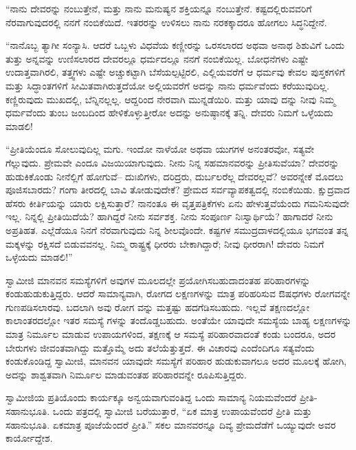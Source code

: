 “ನಾನು ದೇವರನ್ನು ನಂಬುತ್ತೇನೆ, ಮತ್ತು ನಾನು ಮನುಷ್ಯನ ಶಕ್ತಿಯನ್ನೂ ನಂಬುತ್ತೇನೆ. ಕಷ್ಟದಲ್ಲಿರುವವರಿಗೆ ನೆರವಾಗುವುದರಲ್ಲಿ ನನಗೆ ನಂಬಿಕೆಯಿದೆ. ಇತರರನ್ನು ಉಳಿಸಲು ನಾನು ನರಕಕ್ಕಾದರೂ ಹೋಗಲು ಸಿದ್ಧನಿದ್ದೇನೆ.

“ನಾನೊಬ್ಬ ತ್ಯಾಗೀ ಸಂನ್ಯಾಸಿ. ಆದರೆ ಒಬ್ಬಳು ವಿಧವೆಯ ಕಣ್ಣೀರನ್ನು ಒರಸಲಾರದ ಅಥವಾ ಅನಾಥ ಶಿಶುವಿಗೆ ಒಂದು ತುತ್ತು ಅನ್ನವನ್ನು ಉಣಿಸಲಾರದ ದೇವರಲ್ಲೂ ಧರ್ಮದಲ್ಲೂ ನನಗೆ ನಂಬಿಕೆಯಿಲ್ಲ. ಬೋಧನೆಗಳು ಎಷ್ಟೇ ಉದಾತ್ತವಾಗಿರಲಿ, ತತ್ತ್ವಗಳು ಎಷ್ಟೇ ಅಚ್ಚುಕಟ್ಟಾಗಿ ಬೆಸೆಯಲ್ಪಟ್ಟಿರಲಿ, ಎಲ್ಲಿಯವರೆಗೆ ಆ ಧರ್ಮವು ಕೇವಲ ಪುಸ್ತಕಗಳಿಗೆ ಮತ್ತು ಸಿದ್ಧಾಂತಗಳಿಗೆ ಸೀಮಿತವಾಗಿರುತ್ತದೆಯೋ ಅಲ್ಲಿಯವರೆಗೆ ಅದನ್ನು ನಾನು ಧರ್ಮವೆಂದು ಕರೆಯುವುದಿಲ್ಲ. ಕಣ್ಣಿರುವುದು ಮುಖದಲ್ಲಿ, ಬೆನ್ನಿನಲ್ಲಲ್ಲ. ಆದ್ದರಿಂದ ನೇರವಾಗಿ ಮುನ್ನಡೆಯಿರಿ. ಮತ್ತು ಯಾವು ದನ್ನು ನೀವು ನಿಮ್ಮ ಧರ್ಮವೆಂದು ತುಂಬ ಜಂಬದಿಂದ ಹೇಳಿಕೊಳ್ಳುತ್ತೀರೋ ಅದನ್ನು ಅನುಷ್ಠಾನಕ್ಕೆ ತನ್ನಿ. ದೇವರು ನಿಮಗೆ ಒಳ್ಳೆಯದು ಮಾಡಲಿ!

“ಪ್ರೀತಿಯೆಂದೂ ಸೋಲುವುದಿಲ್ಲ ಮಗು. ಇಂದೋ ನಾಳೆಯೋ ಅಥವಾ ಯುಗಗಳ ಅನಂತರವೋ, ಸತ್ಯವೇ ಗೆಲ್ಲುವುದು. ಪ್ರೇಮವೇ ಎಂದೂ ವಿಜಯಿಯಾಗುವುದು. ನೀನು ನಿನ್ನ ಸಹಮಾನವರನ್ನು ಪ್ರೀತಿಸುವೆಯಾ? ದೇವರನ್ನು ಹುಡುಕಿಕೊಂಡು ನೀನೆಲ್ಲಿಗೆ ಹೋಗುವೆ– ದುಃಖಿಗಳು, ದರಿದ್ರರು, ದುರ್ಬಲರೆಲ್ಲ ದೇವರಲ್ಲವೆ? ಅವರನ್ನೇಕೆ ಮೊದಲು ಪೂಜಿಸಬಾರದು? ಗಂಗಾ ತೀರದಲ್ಲಿ ಬಾವಿ ತೋಡುವುದೇಕೆ? ಪ್ರೇಮದ ಸರ್ವವ್ಯಾಪಕತ್ವದಲ್ಲಿ ನಂಬಿಕೆಯಿಡು. ಕ್ಷುದ್ರವಾದ ಹೆಸರು ಕೀರ್ತಿಯನ್ನು ಯಾರು ಲಕ್ಷಿಸುತ್ತಾರೆ? ನಾನಂತೂ ಈ ವೃತ್ತಪತ್ರಿಕೆಗಳು ಏನು ಹೇಳುತ್ತವೆಯೆಂದು ಗಮನಿಸುವುದೇ ಇಲ್ಲ. ನಿನ್ನಲ್ಲಿ ಪ್ರೀತಿಯಿದೆಯೆ? ಹಾಗಿದ್ದರೆ ನೀನು ಸರ್ವಶಕ್ತ. ನೀನು ಸಂಪೂರ್ಣ ನಿಃಸ್ವಾರ್ಥಿಯೆ? ಹಾಗಾದರೆ ನೀನು ಅಪ್ರತಿಹತ. ಎಲ್ಲೆಡೆಯೂ ನಿನಗೆ ನೆರವಾಗುವುದು ನಿನ್ನ ಶೀಲವೊಂದೇ. ಕಷ್ಟಗಳ ಸಮುದ್ರದಾಳದಲ್ಲಿಯೂ ಭಗವಂತ ತನ್ನ ಮಕ್ಕಳನ್ನು ರಕ್ಷಿಸದೆ ಬಿಡುವವನಲ್ಲ. ನಿಮ್ಮ ರಾಷ್ಟ್ರಕ್ಕೆ ಧೀರರು ಬೇಕಾಗಿದ್ದಾರೆ; ನೀವು ಧೀರರಾಗಿ! ದೇವರು ನಿಮಗೆ ಒಳ್ಳೆಯದು ಮಾಡಲಿ!”

ಸ್ವಾಮೀಜಿ ಮಾನವನ ಸಮಸ್ಯೆಗಳಿಗೆ ಅವುಗಳ ಮೂಲದಲ್ಲೇ ಪ್ರಯೋಗಿಸಬಹುದಾದಂತಹ ಪರಿಹಾರಗಳನ್ನು ಕಂಡುಹುಡುಕುತ್ತಿದ್ದರು. ಆದರೆ ಸಾಮಾನ್ಯವಾಗಿ, ರೋಗದ ಲಕ್ಷಣಗಳನ್ನು ಮಾತ್ರ ಪರಿಹರಿಸುವ ಔಷಧಗಳು ರೋಗವನ್ನೇ ಗುಣಪಡಿಸಲಾರವು. ಬದಲಾಗಿ ಅವು ರೋಗ ವನ್ನು ಮತ್ತಷ್ಟು ಹದಗೆಡಿಸಬಹುದು. ಇಲ್ಲವೆ ತಕ್ಷಣದಲ್ಲೋ ಕಾಲಾಂತರದಲ್ಲೋ ಇತರ ಸಮಸ್ಯೆ ಗಳನ್ನು ತಂದೊಡ್ಡಬಹುದು. ಅಂತೆಯೇ ಯಾವುದೇ ಸಮಸ್ಯೆಯ ಬಾಹ್ಯ ಲಕ್ಷಣಗಳನ್ನು ಮಾತ್ರ ನಿರ್ಮೂಲ ಮಾಡುವ ಉಪಾಯಗಳಿಂದ, ತಕ್ಷಣಕ್ಕೆ ಆ ಸಮಸ್ಯೆ ಪರಿಹಾರವಾದಂತೆ ಕಂಡು ಬಂದರೂ, ಅದರ ಬೇರುಗಳು ಜೀವಂತವಾಗಿದ್ದು ಮತ್ತೊಮ್ಮೆ ಅದು ತಲೆಯೆತ್ತುತ್ತದೆ. ಈ ವಿಚಾರವು ಎಂದೆಂದಿಗೂ ಸತ್ಯವೆಂದು ಕಂಡುಕೊಂಡಿದ್ದ ಸ್ವಾಮೀಜಿ, ಮಾನವನ ಯಾವುದೇ ಸಮಸ್ಯೆಗೆ ಪರಿಹಾರ ಹುಡುಕುವಾಗಲೂ ಅದರ ಮೂಲಕ್ಕೆ ಹೋಗಿ, ಅದನ್ನು ಶಾಶ್ವತವಾಗಿ ನಿರ್ಮೂಲ ಮಾಡುವಂತಹ ಪರಿಹಾರವನ್ನೇ ರೂಪಿಸುತ್ತಿದ್ದರು.

ಸ್ವಾಮೀಜಿಯ ಪ್ರತಿಯೊಂದು ಕಾರ್ಯಕ್ಕೂ ಅನ್ವಯವಾಗುವಂತಿದ್ದ ಒಂದು ಸಾಮಾನ್ಯ ನಿಯಮವೆಂದರೆ ಪ್ರೀತಿ-ಸಹಾನುಭೂತಿ. ಒಂದು ಪತ್ರದಲ್ಲಿ ಸ್ವಾಮೀಜಿ ಬರೆಯುತ್ತಾರೆ, “ಏಕ ಮಾತ್ರ ಉಪಾಯವೆಂದರೆ ಪ್ರೀತಿ ಮತ್ತು ಸಹಾನುಭೂತಿ. ಏಕಮಾತ್ರ ಪೂಜೆಯೆಂದರೆ ಪ್ರೀತಿ.” ಸಕಲ ಮಾನವರನ್ನೂ ದಿವ್ಯ ಪ್ರೇಮದೆಡೆಗೆ ಒಯ್ಯುವುದೇ ಅವರ ಕಾರ್ಯೋದ್ದೇಶ.

